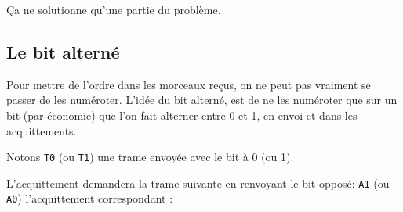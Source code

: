 Ça ne solutionne qu'une partie du problème.

\subsection{Le bit alterné}

Pour mettre de l'ordre dans les morceaux reçus, on ne peut pas vraiment se passer de les numéroter. L'idée du bit alterné, est de ne les numéroter que sur un bit (par économie) que l'on fait alterner entre 0 et 1, en envoi et dans les acquittements.

Notons \texttt{T0} (ou \texttt{T1}) une trame envoyée avec le bit à 0 (ou 1).

L'acquittement demandera la trame suivante en renvoyant le bit opposé: \texttt{A1} (ou \texttt{A0}) l'acquittement correspondant : 

